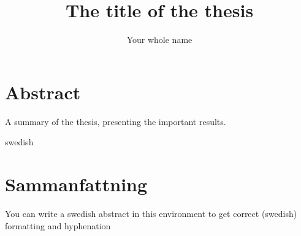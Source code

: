 \documentclass[english,bachelor]{liumaiex}
\begin{document}
\frontmatter


%
%
\title{The title of the thesis}
\author{Your whole name}

\maketitle




%
%
\chapter*{Abstract}

A summary of the thesis, presenting the important results.

\placeenkeywords
\placeenurl

\cleardoublepage
\begin{otherlanguage*}{swedish}
\chapter*{Sammanfattning}

You can write a swedish abstract in this environment to get
correct (swedish) formatting and hyphenation

\placesvkeywords
\placesvurl
\end{otherlanguage*}
\end{document}
